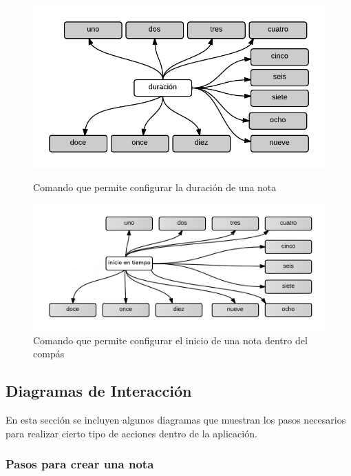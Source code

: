 \begin{figure}[H]
\begin{minipage}[b]{0.5\linewidth}
\centering
\includegraphics[width=0.9\linewidth]{./graphics/cmd-dur.png}
\caption{Comando que permite configurar la duraci\'on de una nota}
\label{figure:cmd-dur}
\end{minipage}
\quad
\begin{minipage}[b]{0.5\linewidth}
\centering
\includegraphics[width=1.1\linewidth]{./graphics/cmd-note-tiempo.png}
\caption{Comando que permite configurar el inicio de una nota dentro del comp\'as}
\label{figure:cmd-note-tiempo}
\end{minipage}
\end{figure}

\subsection{Diagramas de Interacci\'on}

En esta secci\'on se incluyen algunos diagramas que muestran los pasos necesarios para realizar cierto 
tipo de acciones dentro de la aplicaci\'on.

\subsubsection{Pasos para crear una nota}

